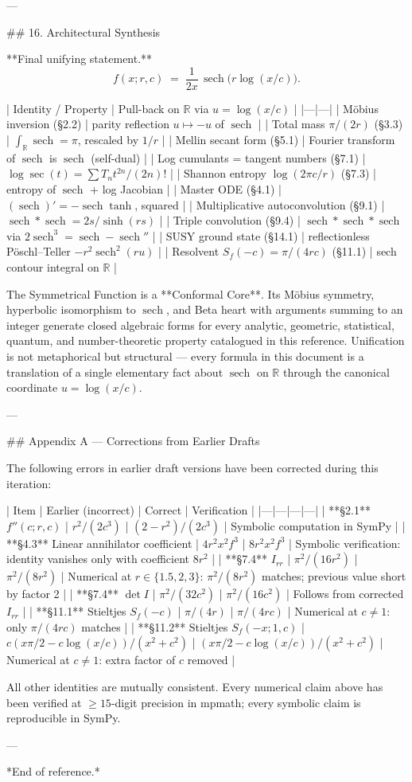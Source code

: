 ---

## 16. Architectural Synthesis

**Final unifying statement.**
$$
\boxed{\;f(x;r,c) \;=\; \frac{1}{2x}\,\operatorname{sech}\!\bigl(r\log(x/c)\bigr).\;}
$$

| Identity / Property | Pull-back on $\mathbb R$ via $u=\log(x/c)$ |
|---|---|
| Möbius inversion (§2.2) | parity reflection $u\mapsto -u$ of $\operatorname{sech}$ |
| Total mass $\pi/(2r)$ (§3.3) | $\int_{\mathbb R}\operatorname{sech}=\pi$, rescaled by $1/r$ |
| Mellin secant form (§5.1) | Fourier transform of $\operatorname{sech}$ is $\operatorname{sech}$ (self-dual) |
| Log cumulants = tangent numbers (§7.1) | $\log\sec(t) = \sum T_{n}t^{2n}/(2n)!$ |
| Shannon entropy $\log(2\pi c/r)$ (§7.3) | entropy of $\operatorname{sech}$ + log Jacobian |
| Master ODE (§4.1) | $(\operatorname{sech})' = -\operatorname{sech}\tanh$, squared |
| Multiplicative autoconvolution (§9.1) | $\operatorname{sech}*\operatorname{sech} = 2s/\sinh(rs)$ |
| Triple convolution (§9.4) | $\operatorname{sech}*\operatorname{sech}*\operatorname{sech}$ via $2\operatorname{sech}^{3} = \operatorname{sech}-\operatorname{sech}''$ |
| SUSY ground state (§14.1) | reflectionless Pöschl–Teller $-r^{2}\operatorname{sech}^{2}(ru)$ |
| Resolvent $S_{f}(-c) = \pi/(4rc)$ (§11.1) | sech contour integral on $\mathbb R$ |

The Symmetrical Function is a **Conformal Core**. Its Möbius symmetry, hyperbolic isomorphism to $\operatorname{sech}$, and Beta heart with arguments summing to an integer generate closed algebraic forms for every analytic, geometric, statistical, quantum, and number-theoretic property catalogued in this reference. Unification is not metaphorical but structural — every formula in this document is a translation of a single elementary fact about $\operatorname{sech}$ on $\mathbb R$ through the canonical coordinate $u=\log(x/c)$.

---

## Appendix A — Corrections from Earlier Drafts

The following errors in earlier draft versions have been corrected during this iteration:

| Item | Earlier (incorrect) | Correct | Verification |
|---|---|---|---|
| **§2.1** $f''(c;r,c)$ | $r^{2}/(2c^{3})$ | $(2-r^{2})/(2c^{3})$ | Symbolic computation in SymPy |
| **§4.3** Linear annihilator coefficient | $4r^{2}x^{2}f^{3}$ | $8r^{2}x^{2}f^{3}$ | Symbolic verification: identity vanishes only with coefficient $8r^{2}$ |
| **§7.4** $I_{rr}$ | $\pi^{2}/(16r^{2})$ | $\pi^{2}/(8r^{2})$ | Numerical at $r\in\{1.5,2,3\}$: $\pi^{2}/(8r^{2})$ matches; previous value short by factor 2 |
| **§7.4** $\det I$ | $\pi^{2}/(32c^{2})$ | $\pi^{2}/(16c^{2})$ | Follows from corrected $I_{rr}$ |
| **§11.1** Stieltjes $S_{f}(-c)$ | $\pi/(4r)$ | $\pi/(4rc)$ | Numerical at $c\ne 1$: only $\pi/(4rc)$ matches |
| **§11.2** Stieltjes $S_{f}(-x;1,c)$ | $c(x\pi/2-c\log(x/c))/(x^{2}+c^{2})$ | $(x\pi/2-c\log(x/c))/(x^{2}+c^{2})$ | Numerical at $c\ne 1$: extra factor of $c$ removed |

All other identities are mutually consistent. Every numerical claim above has been verified at $\ge 15$-digit precision in mpmath; every symbolic claim is reproducible in SymPy.

---

*End of reference.*
